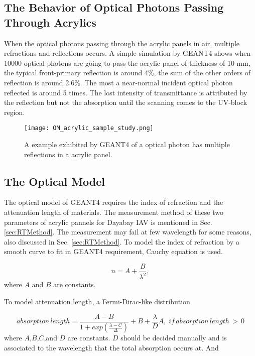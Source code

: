 \subsection {The Behavior of Optical Photons Passing Through Acrylics}

When the optical photons passing through the acrylic panels in air, multiple refractions
and reflections occurs. A simple simulation by GEANT4 shows when 10000 optical photons
are going to pass the acrylic panel of thickness of 10 mm, the typical front-primary
reflection is around 4\%, the sum of the other orders of reflection is around 2.6\%.
The most a near-normal incident optical photon reflected is around 5 times.
The lost intensity of transmittance is attributed by the reflection but not the
absorption until the scanning comes to the UV-block region.


\begin{figure}
    \centering
    \texttt{[image: OM\_acrylic\_sample\_study.png]}
    \caption[A example exhibited by GEANT4 of a optical photon has multiple reflections in a acrylic panel.]
{
A example exhibited by GEANT4 of a optical photon has multiple reflections in a acrylic panel.
}
    \label{fig:OM_acrylic_sample_study.png}
    \end{figure}



\subsection {The Optical Model}
\label{sec:opticalModel}

The optical model of GEANT4 requires the index of refraction and the attenuation length
of materials. The measurement method of these two parameters of acrylic pannels for Dayabay IAV
is mentioned in Sec. \ref{sec:RTMethod}.
The measurement may fail at few wavelength for some reasons, also discussed
in Sec. \ref{sec:RTMethod}.
To model the index of refraction by a smooth curve to fit in GEANT4 requirement, Cauchy equation
is used.

\begin{equation}
\label{eq:Chauchy}
n = A + \frac{B}{\lambda^2},
\end{equation}
where $A$ and $B$ are constants.


To model attenuation length, a Fermi-Dirac-like distribution


\begin{equation}
\label{eq:AttenuationModelA}
absorption\,length = {\frac{A - B}{1 + exp(\frac{\lambda - C}{\Delta})}} + B + {\frac{\lambda}{D}}A,\;if\,absorption\,length\,>\,0
\end{equation}
where $A$,$B$,$C$,and $D$ are constants. $D$ should be decided manually and is associated to the wavelength that the total
absorption occurs at. And


